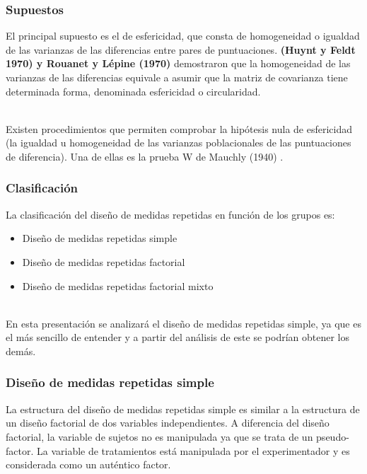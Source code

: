 \documentclass[12pt]{beamer}
\begin{document}
\begin{frame}
\frametitle{Supuestos}
El principal supuesto es el de esfericidad, que consta de homogeneidad o igualdad de las
varianzas de las diferencias entre pares de puntuaciones. \textbf{(Huynt y Feldt 1970) y Rouanet y
Lépine (1970)} demostraron que la homogeneidad de las varianzas de las diferencias equivale a
asumir que la matriz de covarianza tiene determinada forma, denominada esfericidad o
circularidad.

~\\Existen procedimientos que permiten comprobar la hipótesis nula de
esfericidad (la igualdad u homogeneidad de las varianzas poblacionales de las puntuaciones de
diferencia). Una de ellas es la prueba W de Mauchly (1940) .
\end{frame}

\begin{frame}
\frametitle{Clasificación}
La clasificación del diseño de medidas repetidas en función de los grupos es:
\begin{itemize}
\item Diseño de medidas repetidas simple
\item Diseño de medidas repetidas factorial
\item Diseño de medidas repetidas factorial mixto
\end{itemize}
~\\En esta presentación se analizará el diseño de medidas repetidas simple, ya que es el más sencillo de entender y a partir del análisis de este se podrían obtener los demás.
\end{frame}

\begin{frame}
\frametitle{Diseño de medidas repetidas simple}
La estructura del diseño de medidas repetidas simple es similar a la estructura de un diseño
factorial de dos variables independientes. A diferencia del diseño factorial, la variable de sujetos no
es manipulada ya que se trata de un pseudo-factor. La variable de tratamientos está manipulada
por el experimentador y es considerada como un auténtico factor.
\end{frame}
\end{document}
